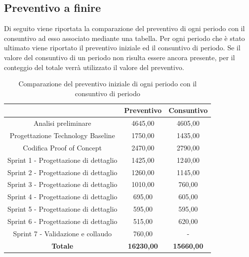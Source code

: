 \subsection{Preventivo a finire} \label{subsection:preventivo_a_finire}
Di seguito viene riportata la comparazione del preventivo di ogni periodo con il consuntivo ad esso associato mediante una tabella.
Per ogni periodo che è stato ultimato viene riportato il preventivo iniziale ed il consuntivo di periodo.
Se il valore del consuntivo di un periodo non risulta essere ancora presente, per il conteggio del totale verrà utilizzato il valore del preventivo.
\begin{table}[H]
  \centering
  \renewcommand{\arraystretch}{1.8}
  \begin{tabular}{c|c|c}
    \rowcolor[HTML]{125E28}
    \multicolumn{1}{c}{\color[HTML]{FFFFFF}\textbf{Periodo}}
                                          & \multicolumn{1}{c}{\color[HTML]{FFFFFF}\textbf{Preventivo}}
                                          & \multicolumn{1}{c}{\color[HTML]{FFFFFF}\textbf{Consuntivo}}                     \\
    \hline
    Analisi preliminare                   & 4645,00                                                     & 4605,00           \\
    Progettazione Technology Baseline     & 1750,00                                                     & 1435,00           \\
    Codifica Proof of Concept             & 2470,00                                                     & 2790,00           \\
    Sprint 1 - Progettazione di dettaglio & 1425,00                                                     & 1240,00           \\
    Sprint 2 - Progettazione di dettaglio & 1260,00                                                     & 1145,00           \\
    Sprint 3 - Progettazione di dettaglio & 1010,00                                                     & 760,00            \\
    Sprint 4 - Progettazione di dettaglio & 695,00                                                      & 605,00            \\
    Sprint 5 - Progettazione di dettaglio & 595,00                                                      & 595,00            \\
    Sprint 6 - Progettazione di dettaglio & 515,00                                                      & 620,00            \\
    Sprint 7 - Validazione e collaudo     & 760,00                                                      & -                 \\
    \textbf{Totale}                       & \textbf{16230,00}                                           & \textbf{15660,00} \\
  \end{tabular}
  \caption{Comparazione del preventivo iniziale di ogni periodo con il consuntivo di periodo}
\end{table}

